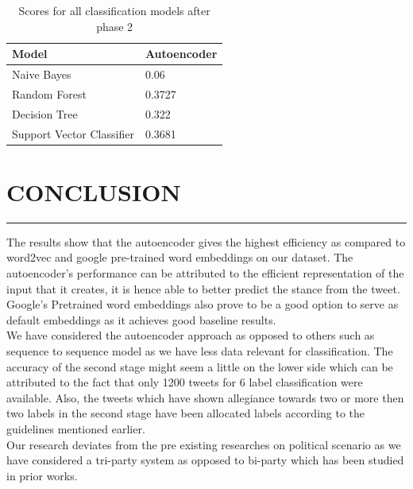 \documentclass[a4paper,11pt]{article}
\begin{document}
\begin{table}[!htbp]
\caption{Scores for all classification models after phase 2}
\medskip
\centering
\begin{tabular}{|p{5cm}|p{4cm}|}
\hline
Model&Autoencoder \\
 \hline \hline
Naive Bayes  & 0.06 \\ 
 \hline
Random Forest  & 0.3727 \\  
\hline
Decision Tree & 0.322 \\
\hline
Support Vector Classifier  & 0.3681 \\
\hline
\end{tabular}
\label{tab:lab1}
\end{table}

\newpage

\section{CONCLUSION}
\hrule
\vspace*{5mm}

The results show that the autoencoder gives the highest efficiency as compared to word2vec and google pre-trained word embeddings on our dataset. The autoencoder's performance can be attributed to the efficient representation of the input that it creates, it is hence able to better predict the stance from the tweet. Google's Pretrained word embeddings also prove to be a good option to serve as default embeddings as it achieves good baseline results.
\newline\\
We have considered the autoencoder approach as opposed to others such as sequence to sequence model as we have less data relevant for classification. The accuracy of the second stage might seem a little on the lower side which can be attributed to the fact that only 1200 tweets for 6 label classification were available.
Also, the tweets which have shown allegiance towards two or more then two labels in the second stage have been allocated labels according to the guidelines mentioned earlier.
\newline\\
Our research deviates from the pre existing researches on political scenario as we have considered a tri-party system as opposed to bi-party which has been studied in prior works.

\newpage 
\end{document}
